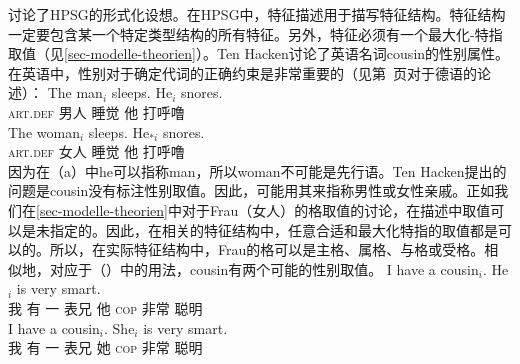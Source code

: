\mbox{}讨论了HPSG\indexhpsg 的形式化设想。在HPSG中，特征描述用于描写特征结构。特征结构一定要包含某一个特定类型结构的所有特征。另外，特征必须有一个最大化-特指取值（见\ref{sec-modelle-theorien}）。Ten Hacken讨论了英语名词cousin的性别属性。在英语中，性别对于确定代词的正确约束是非常重要的（见第~\pageref{le-buch}页对于德语的论述）：
\eal
\ex 
\gll The man$_i$ sleeps. He$_i$ snores.\\
	 \textsc{art}.\textsc{def} 男人 睡觉 他  打呼噜\\
\ex 
\gll The woman$_i$ sleeps. He$_{*i}$ snores.\\
	 \textsc{art}.\textsc{def} 女人 睡觉 他  打呼噜\\
\zl
因为在（a）中he可以指称man，所以woman不可能是先行语。Ten Hacken提出的问题是cousin没有标注性别取值。因此，可能用其来指称男性或女性亲戚。正如我们在\ref{sec-modelle-theorien}中对于Frau（女人）的格取值的讨论，在描述中取值可以是未指定的。因此，在相关的特征结构中，任意合适和最大化特指的取值都是可以的。所以，在实际特征结构中，Frau的格可以是主格、属格、与格或受格。相似地，对应于（）中的用法，cousin有两个可能的性别取值。
\eal
\ex 
\gll I have a cousin$_i$. He$_i$ is very smart.\\
	 我 有 一 表兄 他 \textsc{cop} 非常 聪明\\
\ex 
\gll I have a cousin$_i$. She$_i$ is very smart.\\
	 我 有 一 表兄 她 \textsc{cop} 非常 聪明\\
\zl

